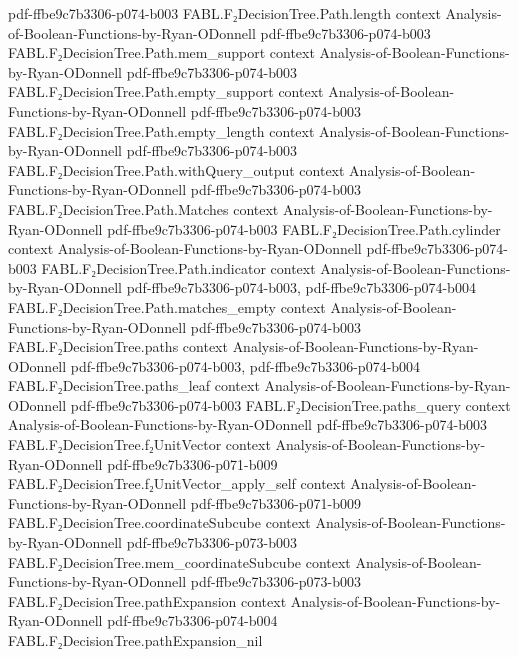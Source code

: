 \begin{theorem}
  {pdf-ffbe9c7b3306-p074-b003}
\proofstep
  {FABL.F₂DecisionTree.Path.length}
  {context}
  {Analysis-of-Boolean-Functions-by-Ryan-ODonnell}
  {pdf-ffbe9c7b3306-p074-b003}
\proofstep
  {FABL.F₂DecisionTree.Path.mem_support}
  {context}
  {Analysis-of-Boolean-Functions-by-Ryan-ODonnell}
  {pdf-ffbe9c7b3306-p074-b003}
\proofstep
  {FABL.F₂DecisionTree.Path.empty_support}
  {context}
  {Analysis-of-Boolean-Functions-by-Ryan-ODonnell}
  {pdf-ffbe9c7b3306-p074-b003}
\proofstep
  {FABL.F₂DecisionTree.Path.empty_length}
  {context}
  {Analysis-of-Boolean-Functions-by-Ryan-ODonnell}
  {pdf-ffbe9c7b3306-p074-b003}
\proofstep
  {FABL.F₂DecisionTree.Path.withQuery_output}
  {context}
  {Analysis-of-Boolean-Functions-by-Ryan-ODonnell}
  {pdf-ffbe9c7b3306-p074-b003}
\proofstep
  {FABL.F₂DecisionTree.Path.Matches}
  {context}
  {Analysis-of-Boolean-Functions-by-Ryan-ODonnell}
  {pdf-ffbe9c7b3306-p074-b003}
\proofstep
  {FABL.F₂DecisionTree.Path.cylinder}
  {context}
  {Analysis-of-Boolean-Functions-by-Ryan-ODonnell}
  {pdf-ffbe9c7b3306-p074-b003}
\proofstep
  {FABL.F₂DecisionTree.Path.indicator}
  {context}
  {Analysis-of-Boolean-Functions-by-Ryan-ODonnell}
  {pdf-ffbe9c7b3306-p074-b003,
    pdf-ffbe9c7b3306-p074-b004}
\proofstep
  {FABL.F₂DecisionTree.Path.matches_empty}
  {context}
  {Analysis-of-Boolean-Functions-by-Ryan-ODonnell}
  {pdf-ffbe9c7b3306-p074-b003}
\proofstep
  {FABL.F₂DecisionTree.paths}
  {context}
  {Analysis-of-Boolean-Functions-by-Ryan-ODonnell}
  {pdf-ffbe9c7b3306-p074-b003,
    pdf-ffbe9c7b3306-p074-b004}
\proofstep
  {FABL.F₂DecisionTree.paths_leaf}
  {context}
  {Analysis-of-Boolean-Functions-by-Ryan-ODonnell}
  {pdf-ffbe9c7b3306-p074-b003}
\proofstep
  {FABL.F₂DecisionTree.paths_query}
  {context}
  {Analysis-of-Boolean-Functions-by-Ryan-ODonnell}
  {pdf-ffbe9c7b3306-p074-b003}
\proofstep
  {FABL.F₂DecisionTree.f₂UnitVector}
  {context}
  {Analysis-of-Boolean-Functions-by-Ryan-ODonnell}
  {pdf-ffbe9c7b3306-p071-b009}
\proofstep
  {FABL.F₂DecisionTree.f₂UnitVector_apply_self}
  {context}
  {Analysis-of-Boolean-Functions-by-Ryan-ODonnell}
  {pdf-ffbe9c7b3306-p071-b009}
\proofstep
  {FABL.F₂DecisionTree.coordinateSubcube}
  {context}
  {Analysis-of-Boolean-Functions-by-Ryan-ODonnell}
  {pdf-ffbe9c7b3306-p073-b003}
\proofstep
  {FABL.F₂DecisionTree.mem_coordinateSubcube}
  {context}
  {Analysis-of-Boolean-Functions-by-Ryan-ODonnell}
  {pdf-ffbe9c7b3306-p073-b003}
\proofstep
  {FABL.F₂DecisionTree.pathExpansion}
  {context}
  {Analysis-of-Boolean-Functions-by-Ryan-ODonnell}
  {pdf-ffbe9c7b3306-p074-b004}
\proofstep
  {FABL.F₂DecisionTree.pathExpansion_nil}

\end{theorem}
